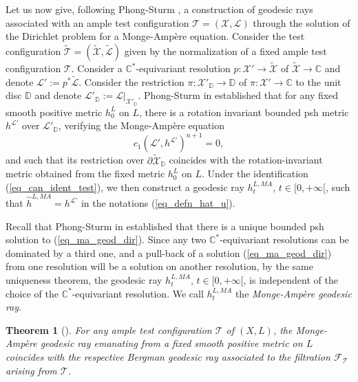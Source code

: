 \documentclass[12pt]{article}
\numberwithin{equation}{section}
\theoremstyle{theorem}
\newtheorem{thm}{Theorem}[section]
\theoremstyle{definition}
\theoremstyle{remark}
\newcommand{\comp}{\mathbb{C}}
\begin{document}
	\par 
	Let us now give, following Phong-Sturm \cite{PhongSturmDirMA}, a construction of geodesic rays associated with an ample test configuration $\mathcal{T} = (\mathcal{X}, \mathcal{L})$ through the solution of the Dirichlet problem for a Monge-Ampère equation.
	Consider the test configuration $\tilde{\mathcal{T}} = (\tilde{\mathcal{X}}, \tilde{\mathcal{L}})$ given by the normalization of a fixed ample test configuration $\mathcal{T}$.
	Consider a $\comp^*$-equivariant resolution $p : \mathcal{X}' \to \tilde{\mathcal{X}}$ of $\tilde{\mathcal{X}} \to \comp$ and denote $\mathcal{L}' := p^* \tilde{\mathcal{L}}$.
	Consider the restriction $\pi: \mathcal{X}'_{\mathbb{D}} \to \mathbb{D}$ of $\pi: \mathcal{X}' \to \comp$ to the unit disc $\mathbb{D}$ and denote $\mathcal{L}'_{\mathbb{D}} := \mathcal{L}|_{\mathcal{X}'_{\mathbb{D}}}$.
	Phong-Sturm in \cite[Theorem 3]{PhongSturmDirMA} established that for any fixed smooth positive metric $h^L_0$ on $L$, there is a rotation invariant bounded psh metric $h^{\mathcal{L}'}$ over $\mathcal{L}'_{\mathbb{D}}$, verifying the Monge-Ampère equation
	\begin{equation}\label{eq_ma_geod_dir}
		c_1(\mathcal{L}', h^{\mathcal{L}'})^{n + 1} = 0,
	\end{equation}
	and such that its restriction over $\partial \tilde{\mathcal{X}}_{\mathbb{D}}$ coincides with the rotation-invariant metric obtained from the fixed metric $h^L_0$ on $L$.
	Under the identification (\ref{eq_can_ident_test}), we then construct a geodesic ray $h^{L, MA}_t$, $t \in [0, + \infty[$, such that $\hat{h}^{L, MA} = h^{\mathcal{L}'}$ in the notations (\ref{eq_defn_hat_u}).
	\par
	Recall that Phong-Sturm in \cite[Theorem 5]{PhongSturmRegul} established that there is a unique bounded psh solution to (\ref{eq_ma_geod_dir}).
	Since any two $\comp^*$-equivariant resolutions can be dominated by a third one, and a pull-back of a solution (\ref{eq_ma_geod_dir}) from one resolution will be a solution on another resolution, by the same uniqueness theorem, the geodesic ray $h^{L, MA}_t$, $t \in [0, + \infty[$, is independent of the choice of the $\comp^*$-equivariant resolution.
	We call $h^{L, MA}_t$ the \textit{Monge-Ampère geodesic ray}.
	\begin{thm}[{\cite[Theorem 3]{PhongSturmRegul}}]\label{thm_ph_st_compat}
		For any ample test configuration $\mathcal{T}$ of $(X, L)$, the Monge-Ampère geodesic ray emanating from a fixed smooth positive metric on $L$ coincides with the respective Bergman geodesic ray associated to the filtration $\mathcal{F}_{\mathcal{T}}$ arising from $\mathcal{T}$.
	\end{thm}
\end{document}
